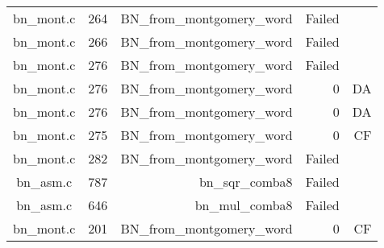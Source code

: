 \begin{table}[h]
{\begin{tabular}{clrrr}
bn\_mont.c&264&BN\_from\_montgomery\_word&Failed&\\
bn\_mont.c&266&BN\_from\_montgomery\_word&Failed&\\
bn\_mont.c&276&BN\_from\_montgomery\_word&Failed&\\
bn\_mont.c&276&BN\_from\_montgomery\_word&0 &DA\\
bn\_mont.c&276&BN\_from\_montgomery\_word&0 &DA\\
bn\_mont.c&275&BN\_from\_montgomery\_word&0 &CF\\
bn\_mont.c&282&BN\_from\_montgomery\_word&Failed&\\
bn\_asm.c&787&bn\_sqr\_comba8&Failed&\\
bn\_asm.c&646&bn\_mul\_comba8&Failed&\\
bn\_mont.c&201&BN\_from\_montgomery\_word&0 &CF\\
\hline
\end{tabular}
}
\end{table}